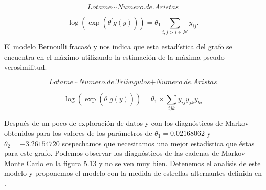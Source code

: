 \begin{equation*}
    \textit{Lotame} \sim \textit{Numero.de.Aristas}
\end{equation*}

\begin{equation*}
    \log \left( \exp \left( \theta ^ { \prime } g ( y ) \right) \right) = \theta _ { 1 }  \sum _ { i , j > i \in \mathcal{N} } y _ { i j }.    
\end{equation*}

El modelo Bernoulli fracasó y nos indica que esta estadística del grafo se encuentra en el máximo utilizando la estimación de la máxima pseudo verosimilitud.




\begin{equation*}
    \textit{Lotame} \sim  \textit{Numero.de.Triángulos+Numero.de.Aristas}
\end{equation*}

\begin{equation*}
    \log \left( \exp \left( \theta ^ { \prime } g ( y ) \right) \right) =  \theta_1    \times \sum _ { i j k }  y _ { i j } y _ { j k } y _ { k i } 
\end{equation*}




Después de un poco de exploración de datos y con los diagnósticos de Markov obtenidos para los valores de los parámetros de $\theta_1 = 0.02168062$ y $\theta_2 = -3.26154720$ sospechamos que necesitamos una mejor estadística que éstas para este grafo. Podemos observar los diagnósticos de las cadenas de Markov Monte Carlo en la figura 5.13 y no se ven muy bien. Detenemos el analisis de este modelo y proponemos el modelo con la medida de estrellas alternantes definida en \cite{Snidjers2006}.

